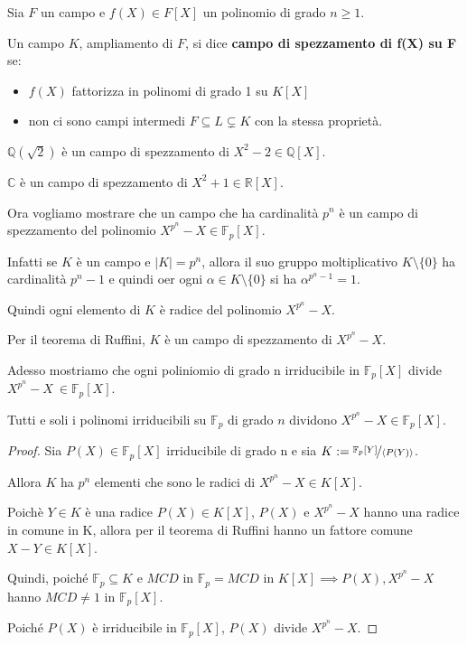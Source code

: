 \documentclass[../main.tex]{subfiles}
\begin{document}
\begin{definition}
    Sia $F$ un campo e $f(X) \in F[X]$ un polinomio di grado $n \geq 1$.

    Un campo $K$, ampliamento di $F$, si dice \textbf{campo di spezzamento di f(X) su F} se:
    \begin{itemize}
        \item $f(X)$ fattorizza in polinomi di grado 1 su $K[X]$
        \item non ci sono campi intermedi $F \subseteq L \subsetneq K$ con la stessa proprietà.
    \end{itemize}
\end{definition}

\begin{example}
    $\mathbb{Q}(\sqrt{2})$ è un campo di spezzamento di $X^2 - 2 \in \mathbb{Q}[X]$.

    $\mathbb{C}$ è un campo di spezzamento di $X^2 + 1 \in \mathbb{R}[X]$.
\end{example}

Ora vogliamo mostrare che un campo che ha cardinalità $p^n$ è un campo di spezzamento del polinomio $X^{p^n} - X \in \mathbb{F}_p[X]$.

Infatti se $K$ è un campo e $|K| = p^n$, allora il suo gruppo moltiplicativo $K \setminus \{0\}$ ha cardinalità $p^n - 1$ e quindi oer ogni $\alpha \in K \setminus \{0\}$ si ha $\alpha^{p^n - 1} = 1$.

Quindi ogni elemento di $K$ è radice del polinomio $X^{p^n} - X$.

Per il teorema di Ruffini, $K$ è un campo di spezzamento di $X^{p^n} - X$.

Adesso mostriamo che ogni poliniomio di grado n irriducibile in $\mathbb{F}_p[X]$ divide $X^{p^n} - X\ \in \mathbb{F}_p[X]$.

\begin{proposition}
    Tutti e soli i polinomi irriducibili su $\mathbb{F}_p$ di grado $n$ dividono $X^{p^n} - X \in \mathbb{F}_p[X]$.
\end{proposition}

\begin{proof}
    Sia $P(X) \in \mathbb{F}_p[X]$ irriducibile di grado n e sia $K := \nicefrac{\mathbb{F}_p[Y]}{\langle P(Y)\rangle}$.

    Allora $K$ ha $p^n$ elementi che sono le radici di $X^{p^n} - X \in K[X]$.

    Poichè $Y \in K$ è una radice $P(X) \in K[X]$, $P(X)$ e $X^{p^n} - X$ hanno una radice in comune in K, allora per il teorema di Ruffini hanno un fattore comune $X - Y \in K[X]$.

    Quindi, poiché $\mathbb{F}_p \subseteq K$ e $MCD$ in $\mathbb{F}_p = MCD$ in $K[X] \implies P(X), X^{p^n} - X$ hanno $MCD \neq 1$ in $\mathbb{F}_p[X]$.

    Poiché $P(X)$ è irriducibile in $\mathbb{F}_p[X]$, $P(X)$ divide $X^{p^n} - X$.
\end{proof}
\end{document}
